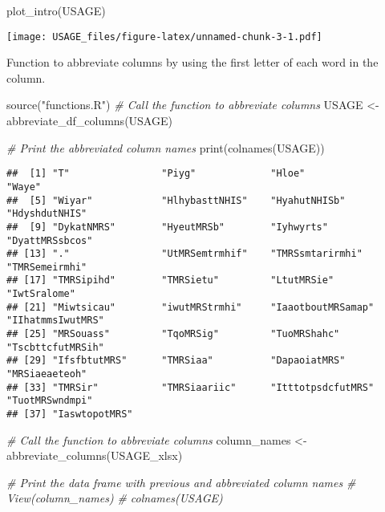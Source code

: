 \documentclass[
]{article}
\newenvironment{Shaded}{\begin{snugshade}}{\end{snugshade}}
\newcommand{\CommentTok}[1]{\textcolor[rgb]{0.56,0.35,0.01}{\textit{#1}}}
\newcommand{\FunctionTok}[1]{\textcolor[rgb]{0.00,0.00,0.00}{#1}}
\newcommand{\NormalTok}[1]{#1}
\newcommand{\OtherTok}[1]{\textcolor[rgb]{0.56,0.35,0.01}{#1}}
\newcommand{\StringTok}[1]{\textcolor[rgb]{0.31,0.60,0.02}{#1}}
\begin{document}
\begin{Shaded}
\begin{Highlighting}[]
\FunctionTok{plot\_intro}\NormalTok{(USAGE)}
\end{Highlighting}
\end{Shaded}

\texttt{[image: USAGE\_files/figure-latex/unnamed-chunk-3-1.pdf]}

Function to abbreviate columns by using the first letter of each word in
the column.

\begin{Shaded}
\begin{Highlighting}[]
\FunctionTok{source}\NormalTok{(}\StringTok{"functions.R"}\NormalTok{)}
\CommentTok{\# Call the function to abbreviate columns}
\NormalTok{USAGE }\OtherTok{\textless{}{-}} \FunctionTok{abbreviate\_df\_columns}\NormalTok{(USAGE)}

\CommentTok{\# Print the abbreviated column names}
\FunctionTok{print}\NormalTok{(}\FunctionTok{colnames}\NormalTok{(USAGE))}
\end{Highlighting}
\end{Shaded}

\begin{verbatim}
##  [1] "T"                "Piyg"             "Hloe"             "Waye"            
##  [5] "Wiyar"            "HlhybasttNHIS"    "HyahutNHISb"      "HdyshdutNHIS"    
##  [9] "DykatNMRS"        "HyeutMRSb"        "Iyhwyrts"         "DyattMRSsbcos"   
## [13] "."                "UtMRSemtrmhif"    "TMRSsmtarirmhi"   "TMRSemeirmhi"    
## [17] "TMRSipihd"        "TMRSietu"         "LtutMRSie"        "IwtSralome"      
## [21] "Miwtsicau"        "iwutMRStrmhi"     "IaaotboutMRSamap" "IIhatmmsIwutMRS" 
## [25] "MRSouass"         "TqoMRSig"         "TuoMRShahc"       "TscbttcfutMRSih" 
## [29] "IfsfbtutMRS"      "TMRSiaa"          "DapaoiatMRS"      "MRSiaeaeteoh"    
## [33] "TMRSir"           "TMRSiaariic"      "ItttotpsdcfutMRS" "TuotMRSwndmpi"   
## [37] "IaswtopotMRS"
\end{verbatim}

\begin{Shaded}
\begin{Highlighting}[]
\CommentTok{\# Call the function to abbreviate columns}
\NormalTok{column\_names }\OtherTok{\textless{}{-}} \FunctionTok{abbreviate\_columns}\NormalTok{(USAGE\_xlsx)}

\CommentTok{\# Print the data frame with previous and abbreviated column names}
\CommentTok{\# View(column\_names)}
\CommentTok{\# colnames(USAGE)}
\end{Highlighting}
\end{Shaded}
\end{document}
